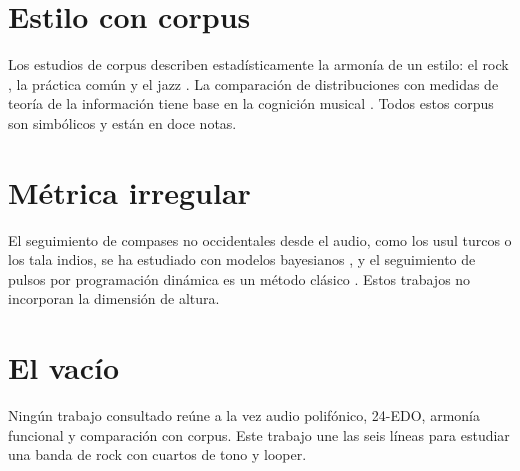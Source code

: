 \section{Estilo con corpus}

Los estudios de corpus describen estadísticamente la armonía de un estilo: el rock \citep{declercq2011,temperley2013},
la práctica común \citep{temperley2009} y el jazz \citep{broze2013,shanahan2012}. La comparación de distribuciones con
medidas de teoría de la información tiene base en la cognición musical \citep{krumhansl1990,huron2006,pearce2018}. Todos
estos corpus son simbólicos y están en doce notas.

\section{Métrica irregular}

El seguimiento de compases no occidentales desde el audio, como los usul turcos o los tala indios, se ha estudiado con
modelos bayesianos \citep{holzapfel2014,srinivasamurthy2016}, y el seguimiento de pulsos por programación dinámica es un
método clásico \citep{ellis2007}. Estos trabajos no incorporan la dimensión de altura.

\section{El vacío}

Ningún trabajo consultado reúne a la vez audio polifónico, 24-EDO, armonía funcional y comparación con corpus. Este
trabajo une las seis líneas para estudiar una banda de rock con cuartos de tono y looper.
